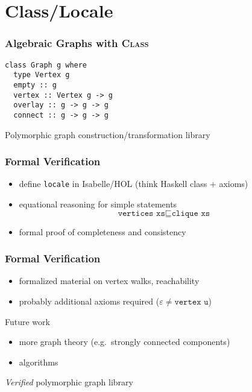 \documentclass{beamer}
\newcommand{\hs}{\texttt}
\renewcommand{\epsilon}{\varepsilon}
\newcommand{\eps}{\epsilon}
\begin{document}
\section{Class/Locale}
\begin{frame}[fragile]
  \frametitle{Algebraic Graphs with \textsc{Class}}
  \onslide<+->
  \begin{verbatim}
class Graph g where
  type Vertex g
  empty :: g
  vertex :: Vertex g -> g
  overlay :: g -> g -> g
  connect :: g -> g -> g
  \end{verbatim}
  \onslide<+->
  \alert{\textrightarrow Polymorphic graph construction/transformation library}
\end{frame}

\begin{frame}
  \frametitle{Formal Verification}
  \begin{itemize}[<+->]
  \item define \texttt{locale} in Isabelle/HOL (think Haskell class + axioms)
  \item equational reasoning for simple statements
    \[
      \hs{vertices xs} \sqsubseteq \hs{clique xs}
    \]
  \item formal proof of completeness and consistency
  \end{itemize}
\end{frame}

\begin{frame}
  \frametitle{Formal Verification}
  \begin{itemize}[<+->]
  \item formalized material on vertex walks, reachability
  \item probably additional axioms required ($\eps \neq \hs{vertex u}$)
  \end{itemize}
  \onslide<+->
  \begin{exampleblock}{Future work}
    \begin{itemize}
    \item more graph theory (e.g.\ strongly connected components)
    \item algorithms
    \end{itemize}
    \onslide<+->
    \textrightarrow{} \alert{\emph{Verified}} polymorphic graph library
  \end{exampleblock}
\end{frame}
\end{document}
